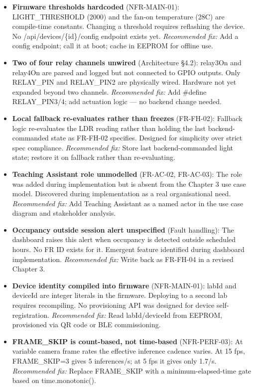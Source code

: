 \begin{itemize}
	\item \textbf{Firmware thresholds hardcoded} (NFR-MAIN-01): LIGHT\_THRESHOLD (2000) and the fan-on temperature (28\textdegree{}C) are compile-time constants. Changing a threshold requires reflashing the device. No /api/devices/\{id\}/config endpoint exists yet. \textit{Recommended fix:} Add a config endpoint; call it at boot; cache in EEPROM for offline use.

	\item \textbf{Two of four relay channels unwired} (Architecture \S4.2): relay3On and relay4On are parsed and logged but not connected to GPIO outputs. Only RELAY\_PIN and RELAY\_PIN2 are physically wired. Hardware not yet expanded beyond two channels. \textit{Recommended fix:} Add \#define RELAY\_PIN3/4; add actuation logic --- no backend change needed.

	\item \textbf{Local fallback re-evaluates rather than freezes} (FR-FH-02): Fallback logic re-evaluates the LDR reading rather than holding the last backend-commanded state as FR-FH-02 specifies. Designed for simplicity over strict spec compliance. \textit{Recommended fix:} Store last backend-commanded light state; restore it on fallback rather than re-evaluating.

	\item \textbf{Teaching Assistant role unmodelled} (FR-AC-02, FR-AC-03): The role was added during implementation but is absent from the Chapter 3 use case model. Discovered during implementation as a real organisational need. \textit{Recommended fix:} Add Teaching Assistant as a named actor in the use case diagram and stakeholder analysis.

	\item \textbf{Occupancy outside session alert unspecified} (Fault handling): The dashboard raises this alert when occupancy is detected outside scheduled hours. No FR ID exists for it. Emergent feature identified during dashboard implementation. \textit{Recommended fix:} Write back as FR-FH-04 in a revised Chapter 3.

	\item \textbf{Device identity compiled into firmware} (NFR-MAIN-01): labId and deviceId are integer literals in the firmware. Deploying to a second lab requires recompiling. No provisioning API was designed for device self-registration. \textit{Recommended fix:} Read labId/deviceId from EEPROM, provisioned via QR code or BLE commissioning.

	\item \textbf{FRAME\_SKIP is count-based, not time-based} (NFR-PERF-03): At variable camera frame rates the effective inference cadence varies. At 15 fps, FRAME\_SKIP=3 gives 5 inferences/s; at 5 fps it gives only 1.7/s. \textit{Recommended fix:} Replace FRAME\_SKIP with a minimum-elapsed-time gate based on time.monotonic().
\end{itemize}


